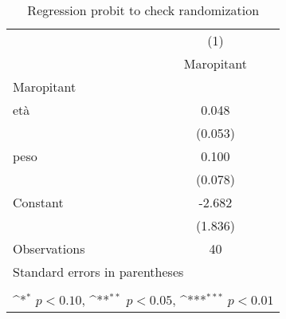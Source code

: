 \begin{table}[htbp]\centering
\def\sym#1{\ifmmode^{#1}\else\(^{#1}\)\fi}
\caption{Regression probit to check randomization}
\begin{tabular}{l*{1}{c}}
\toprule
                    &\multicolumn{1}{c}{(1)}\\
                    &\multicolumn{1}{c}{Maropitant}\\
\midrule
Maropitant          &                     \\
età                 &       0.048         \\
                    &     (0.053)         \\
\addlinespace
peso                &       0.100         \\
                    &     (0.078)         \\
\addlinespace
Constant            &      -2.682         \\
                    &     (1.836)         \\
\midrule
Observations        &          40         \\
\bottomrule
\multicolumn{2}{l}{\footnotesize Standard errors in parentheses}\\
\multicolumn{2}{l}{\footnotesize  }\\
\multicolumn{2}{l}{\footnotesize \sym{*} \(p<0.10\), \sym{**} \(p<0.05\), \sym{***} \(p<0.01\)}\\
\end{tabular}
\end{table}
